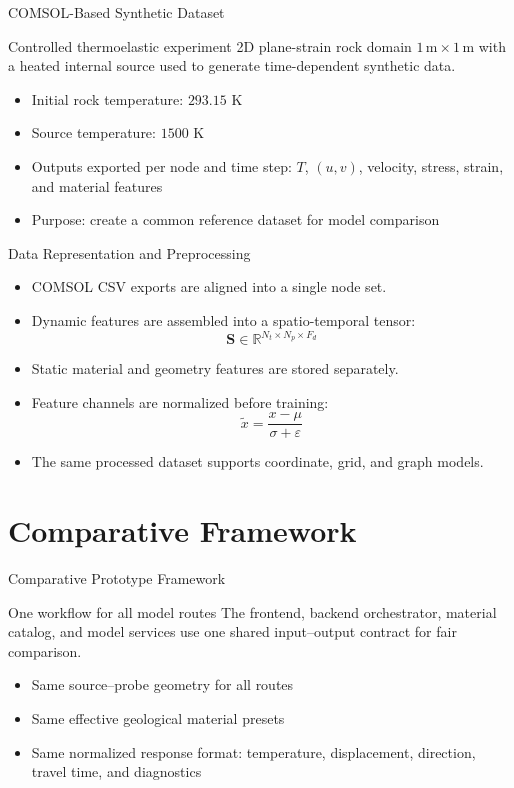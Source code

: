 \documentclass[aspectratio=169,10pt]{beamer}
\begin{document}
\begin{frame}{COMSOL-Based Synthetic Dataset}
  \begin{block}{Controlled thermoelastic experiment}
    2D plane-strain rock domain $1\,\mathrm{m}\times1\,\mathrm{m}$ with a
    heated internal source used to generate time-dependent synthetic data.
  \end{block}
  \vskip 4pt
  \begin{itemize}
    \item Initial rock temperature: $293.15$ K
    \item Source temperature: $1500$ K
    \item Outputs exported per node and time step: $T$, $(u,v)$, velocity,
          stress, strain, and material features
    \item Purpose: create a common reference dataset for model comparison
  \end{itemize}
\end{frame}

\begin{frame}{Data Representation and Preprocessing}
  \begin{itemize}
    \item COMSOL CSV exports are aligned into a single node set.
    \item Dynamic features are assembled into a spatio-temporal tensor:
          \[
            \mathbf{S}\in\mathbb{R}^{N_t \times N_p \times F_d}
          \]
    \item Static material and geometry features are stored separately.
    \item Feature channels are normalized before training:
          \[
            \widetilde{x}=\frac{x-\mu}{\sigma+\varepsilon}
          \]
    \item The same processed dataset supports coordinate, grid, and graph models.
  \end{itemize}
\end{frame}

\section{Comparative Framework}

\begin{frame}{Comparative Prototype Framework}
  \begin{block}{One workflow for all model routes}
    The frontend, backend orchestrator, material catalog, and model
    services use one shared input--output contract for fair comparison.
  \end{block}
  \vskip 6pt
  \begin{itemize}
    \item Same source--probe geometry for all routes
    \item Same effective geological material presets
    \item Same normalized response format: temperature, displacement,
          direction, travel time, and diagnostics
  \end{itemize}
\end{frame}
\end{document}
